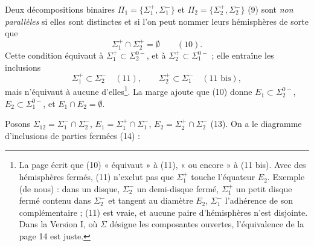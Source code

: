 \documentclass[11pt,a4paper]{article}
\begin{document}
Deux décompositions binaires $\Pi_1 = \{\Sigma_1^{+}, \Sigma_1^{-}\}$ et
$\Pi_2 = \{\Sigma_2^{+}, \Sigma_2^{-}\}$ (9) sont \emph{non parallèles} si
elles sont distinctes et si l'on peut nommer leurs hémisphères de sorte que
\[
\Sigma_1^{+} \cap \Sigma_2^{+} = \emptyset \qquad (10).
\]
Cette condition équivaut à $\Sigma_1^{+} \subset \Sigma_2^{0-}$, et à
$\Sigma_2^{+} \subset \Sigma_1^{0-}$ ; elle entraîne les inclusions
\[
\Sigma_1^{+} \subset \Sigma_2^{-} \quad (11), \qquad \Sigma_2^{+} \subset
\Sigma_1^{-} \quad (11 \text{ bis}),
\]
mais n'équivaut à aucune d'elles\footnote{La page écrit que (10)
« équivaut » à (11), « ou encore » à (11 bis). Avec des hémisphères fermés,
(11) n'exclut pas que $\Sigma_1^{+}$ touche l'équateur $E_2$. Exemple (de
nous) : dans un disque, $\Sigma_2^{-}$ un demi-disque fermé, $\Sigma_1^{+}$ un
petit disque fermé contenu dans $\Sigma_2^{-}$ et tangent au diamètre $E_2$,
$\Sigma_1^{-}$ l'adhérence de son complémentaire ; (11) est vraie, et aucune
paire d'hémisphères n'est disjointe. Dans la Version I, où $\Sigma$ désigne
les composantes ouvertes, l'équivalence de la page 14 est juste.}. La marge
ajoute que (10) donne $E_1 \subset \Sigma_2^{0-}$, $E_2 \subset
\Sigma_1^{0-}$, et $E_1 \cap E_2 = \emptyset$.

Posons $\Sigma_{12} = \Sigma_1^{-} \cap \Sigma_2^{-}$, $E_1 = \Sigma_1^{+}
\cap \Sigma_1^{-}$, $E_2 = \Sigma_2^{+} \cap \Sigma_2^{-}$ (13). On a le
diagramme d'inclusions de parties fermées (14) :

\end{document}
